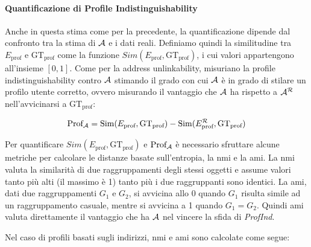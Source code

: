 \paragraph{Quantificazione di Profile Indistinguishability}\label{quantificazione-di-profile-indistinguishability}

Anche in questa stima come per la precedente, la quantificazione dipende dal confronto tra la stima di $\mathcal{A}$ e i dati reali.
Definiamo quindi la similitudine tra $E_\text{prof}$ e $\text{GT}_\text{prof}$ come la funzione $Sim(E_\text{prof}, \text{GT}_\text{prof})$, i cui valori appartengono all'insieme $[0, 1]$.
Come per la address unlinkability, misuriano la profile indistinguishability contro $\mathcal{A}$ stimando il grado con cui $\mathcal{A}$ è in grado di stilare un profilo utente corretto, ovvero misurando il vantaggio che $\mathcal{A}$ ha rispetto a $\mathcal{A}^\mathcal{R}$ nell'avvicinarsi a $\text{GT}_\text{prof}$:

\[ \text{Prof}_{\mathcal{A}} = \text{Sim}(E_\text{prof}, \text{GT}_\text{prof}) - \text{Sim}(E^\mathcal{R}_\text{prof}, \text{GT}_\text{prof}) \]

Per quantificare $Sim(E_\text{prof}, \text{GT}_\text{prof})$ e $\text{Prof}_{\mathcal{A}}$ è necessario sfruttare alcune metriche per calcolare le distanze basate sull'entropia, la \gls{nmi} e la \gls{ami}.
La \gls{nmi} valuta la similarità di due raggruppamenti degli stessi oggetti e assume valori tanto più alti (il massimo è 1) tanto più i due raggruppanti sono identici.
La \gls{ami}, dati due raggruppamenti $G_1$ e $G_2$, si avvicina allo 0 quando $G_1$ risulta simile ad un raggruppamento casuale, mentre si avvicina a 1 quando $G_1 = G_2$. Quindi \gls{ami} valuta direttamente il vantaggio che ha $\mathcal{A}$ nel vincere la sfida di \emph{ProfInd}.

Nel caso di profili basati sugli indirizzi, \gls{nmi} e \gls{ami} sono calcolate come segue:

